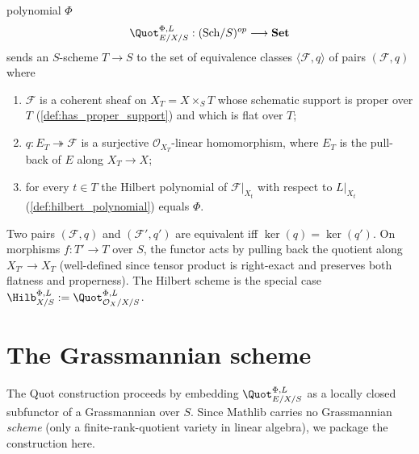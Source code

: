 \begin{definition}
{  polynomial \(\Phi\)}
  \[
    \Quot^{\Phi,L}_{E/X/S} : (\mathrm{Sch}/S)^{op} \longrightarrow \mathbf{Set}
  \]
  sends an \(S\)-scheme \(T \to S\) to the set of equivalence classes
  \(\langle \mathcal{F}, q\rangle\) of pairs \((\mathcal{F}, q)\) where
  \begin{enumerate}
    \item \(\mathcal{F}\) is a coherent sheaf on \(X_T = X \times_S T\) whose
      schematic support is proper over \(T\) (\cref{def:has_proper_support}) and
      which is flat over \(T\);
    \item \(q : E_T \twoheadrightarrow \mathcal{F}\) is a surjective
      \(\mathcal{O}_{X_T}\)-linear homomorphism, where \(E_T\) is the pull-back
      of \(E\) along \(X_T \to X\);
    \item for every \(t \in T\) the Hilbert polynomial of \(\mathcal{F}|_{X_t}\)
      with respect to \(L|_{X_t}\) (\cref{def:hilbert_polynomial}) equals
      \(\Phi\).
  \end{enumerate}
  Two pairs \((\mathcal{F}, q)\) and \((\mathcal{F}', q')\) are equivalent iff
  \(\ker(q) = \ker(q')\). On morphisms \(f : T' \to T\) over \(S\), the functor
  acts by pulling back the quotient along \(X_{T'} \to X_T\) (well-defined
  since tensor product is right-exact and preserves both flatness and
  properness). The Hilbert scheme is the special case
  \(\Hilb^{\Phi,L}_{X/S} := \Quot^{\Phi,L}_{\mathcal{O}_X/X/S}\).
\end{definition}

\section{The Grassmannian scheme}
\label{sec:grassmannian_scheme}

The Quot construction proceeds by embedding \(\Quot^{\Phi,L}_{E/X/S}\) as a
locally closed subfunctor of a Grassmannian over \(S\). Since Mathlib carries
no Grassmannian \emph{scheme} (only a finite-rank-quotient variety in
linear algebra), we package the construction here.


